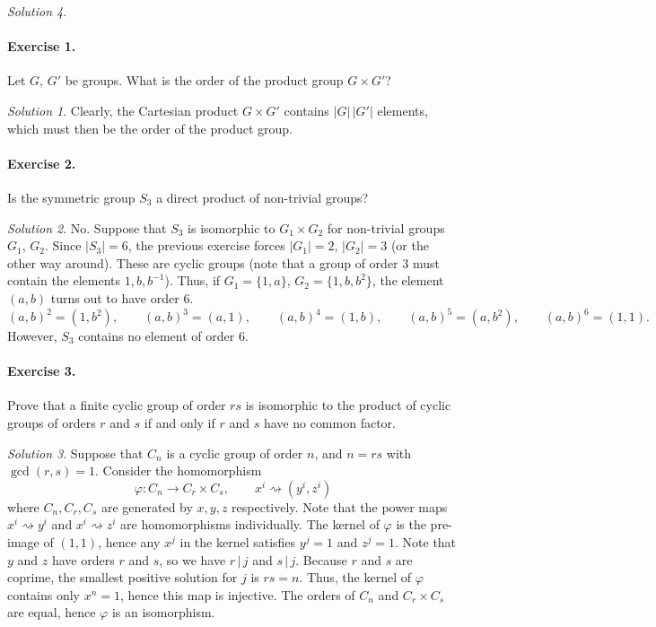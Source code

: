 \documentclass[11pt]{report}
\theoremstyle{remark}
\newtheorem*{solution}{Solution}
\begin{document}
\begin{solution}
    \paragraph{Exercise 1.} Let $G$, $G'$ be groups. What is the order of the
    product group $G \times G'$?
    \begin{solution}
        Clearly, the Cartesian product $G\times G'$ contains $|G|\,|G'|$ elements,
        which must then be the order of the product group.
    \end{solution}
    
    \paragraph{Exercise 2.} Is the symmetric group $S_3$ a direct product of
    non-trivial groups?
    \begin{solution}
        No. Suppose that $S_3$ is isomorphic to $G_1\times G_2$ for non-trivial
        groups $G_1$, $G_2$. Since $|S_3| = 6$, the previous exercise forces $|G_1|
        = 2$, $|G_2| = 3$ (or the other way around). These are cyclic groups (note
        that a group of order $3$ must contain the elements $1, b, b^{-1}$).
        Thus, if $G_1 = \{1, a\}$, $G_2 = \{1, b, b^2\}$, the element $(a, b)$ turns
        out to have order $6$. \[
            (a, b)^2 = (1, b^2), \qquad (a, b)^3 = (a, 1), \qquad (a, b)^4 = (1, b),
            \qquad (a, b)^5 = (a, b^2), \qquad (a, b)^6 = (1, 1).
        \] However, $S_3$ contains no element of order $6$.
    \end{solution}
    
    \paragraph{Exercise 3.} Prove that a finite cyclic group of order $rs$ is
    isomorphic to the product of cyclic groups of orders $r$ and $s$ if and only if
    $r$ and $s$ have no common factor.
    \begin{solution}
        Suppose that $C_n$ is a cyclic group of order $n$, and $n = rs$ with
        $\gcd(r, s) = 1$. Consider the homomorphism \[
            \varphi\colon C_n \to C_r\times C_s, \qquad x^i\rightsquigarrow (y^i,
            z^i)
        \] where $C_n, C_r, C_s$ are generated by $x, y, z$ respectively. Note that
        the power maps $x^i \rightsquigarrow y^i$ and $x^i \rightsquigarrow z^i$ are
        homomorphisms individually. The kernel of $\varphi$ is the pre-image of $(1,
        1)$, hence any $x^j$ in the kernel satisfies $y^j = 1$ and $z^j = 1$. Note
        that $y$ and $z$ have orders $r$ and $s$, so we have $r \,|\, j$ and $s\,|\,
        j$. Because $r$ and $s$ are coprime, the smallest positive solution for $j$
        is $rs = n$. Thus, the kernel of $\varphi$ contains only $x^n = 1$, hence
        this map is injective. The orders of $C_n$ and $C_r\times C_s$ are equal,
        hence $\varphi$ is an isomorphism.


\end{solution}
\end{solution}
\end{document}

